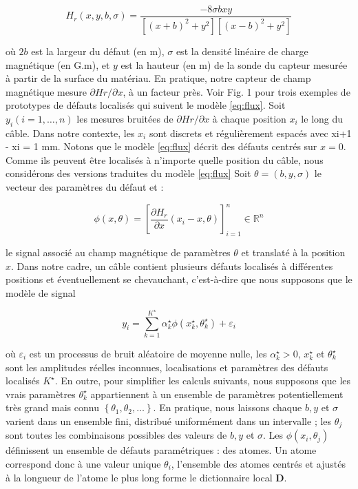 \documentclass[9pt,a4paper,twoside]{rho}
\begin{document}
\begin{equation}
    H_r(x, y, b, \sigma)=\frac{-8 \sigma b x y}{\left[(x+b)^2+y^2\right]\left[(x-b)^2+y^2\right]}
    \label{eq:flux}
\end{equation}

où $2b$ est la largeur du défaut (en m), $\sigma$ est la densité linéaire de charge magnétique (en G.m), et $y$ est la hauteur (en m) de la sonde du capteur mesurée à partir de la surface du matériau.
En pratique, notre capteur de champ magnétique mesure $\partial H r / \partial x$, à un facteur près.
Voir Fig. 1 pour trois exemples de prototypes de défauts localisés qui suivent le modèle \ref*{eq:flux}.
Soit $y_i (i = 1, \ldots ,n)$ les mesures bruitées de $\partial H r / \partial x$ à chaque position $x_i$ le long du câble. Dans notre contexte, les $x_i$ sont discrets et régulièrement espacés avec xi+1 - xi = 1 mm. Notons que le modèle \ref*{eq:flux} décrit des défauts centrés sur $x = 0$.
Comme ils peuvent être localisés à n'importe quelle position du câble, nous considérons des versions traduites du modèle \ref*{eq:flux}
Soit $\theta = (b, y, \sigma)$ le vecteur des paramètres du défaut et : 

\begin{equation}
    \phi(x, \theta)=\left[\frac{\partial H_r}{\partial x}\left(x_i-x, \theta\right)\right]_{i=1}^n \in \mathbb{R}^n
\end{equation}

le signal associé au champ magnétique de paramètres $\theta$ et translaté à la position $x$. 
Dans notre cadre, un câble contient plusieurs défauts localisés à différentes positions et éventuellement se chevauchant, c'est-à-dire que nous supposons que le modèle de signal
       
\begin{equation}
    y_i=\sum_{k=1}^{K^{\star}} \alpha_k^{\star} \phi\left(x_k^{\star}, \theta_k^{\star}\right)+\varepsilon_i
    \label{eq:signal}
\end{equation}

où $\varepsilon_i$ est un processus de bruit aléatoire de moyenne nulle, les $\alpha_k^{\star} > 0$, $x_k^{\star}$ et $\theta_k^{\star}$ sont les amplitudes réelles inconnues, localisations et paramètres des défauts localisés $K^{\star}$.
En outre, pour simplifier les calculs suivants, nous supposons que les vrais paramètres $\theta_k^{\star}$ appartiennent à un ensemble de paramètres potentiellement très grand  mais connu $\left\{\theta_1, \theta_2, \ldots\right\}$. 
En pratique, nous laissons chaque $b, y$ et $\sigma$ varient dans un ensemble fini, distribué uniformément dans un intervalle ; les $\theta_j$ sont toutes les combinaisons possibles des valeurs de $b, y$ et $\sigma$. 
Les $\phi(x_i, \theta_j)$ définissent un ensemble de défauts paramétriques : des atomes. Un atome correspond donc à une valeur unique $\theta_i$, l'ensemble des atomes centrés et ajustés à la longueur de l'atome le plus long forme le dictionnaire local $\mathbf{D}$.
\end{document}
